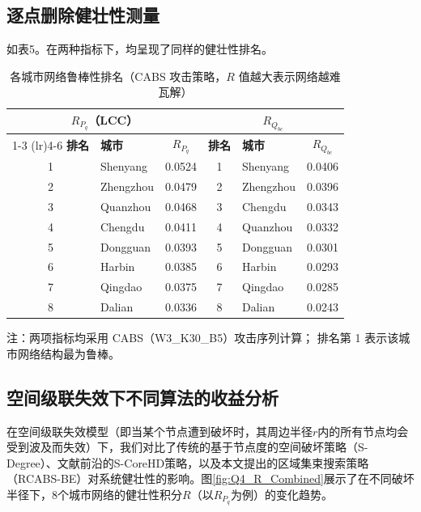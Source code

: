 \subsection{逐点删除健壮性测量}
如表5。在两种指标下，均呈现了同样的健壮性排名。
\begin{table}[htbp]
  \centering
  \caption{各城市网络鲁棒性排名（CABS 攻击策略，\(R\) 值越大表示网络越难瓦解）}
  \label{tab:robustness_ranking}
  \begin{tabular}{clcclc}
    \toprule
    \multicolumn{3}{c}{\(R_{P_q}\)（LCC）} & \multicolumn{3}{c}{\(R_{Q_{bc}}\)} \\
    \cmidrule(lr){1-3} \cmidrule(lr){4-6}
    \textbf{排名} & \textbf{城市} & \(R_{P_q}\) &
    \textbf{排名} & \textbf{城市} & \(R_{Q_{bc}}\) \\
    \midrule
    1 & Shenyang  & 0.0524 & 1 & Shenyang  & 0.0406 \\
    2 & Zhengzhou & 0.0479 & 2 & Zhengzhou & 0.0396 \\
    3 & Quanzhou  & 0.0468 & 3 & Chengdu   & 0.0343 \\
    4 & Chengdu   & 0.0411 & 4 & Quanzhou  & 0.0332 \\
    5 & Dongguan  & 0.0393 & 5 & Dongguan  & 0.0301 \\
    6 & Harbin    & 0.0385 & 6 & Harbin    & 0.0293 \\
    7 & Qingdao   & 0.0375 & 7 & Qingdao   & 0.0285 \\
    8 & Dalian    & 0.0336 & 8 & Dalian    & 0.0243 \\
    \bottomrule
  \end{tabular}
  \begin{minipage}{\linewidth}
    \vspace{2pt}
    \footnotesize 注：两项指标均采用 CABS（W3\_K30\_B5）攻击序列计算；
    排名第 1 表示该城市网络结构最为鲁棒。
  \end{minipage}
\end{table}

\subsection{空间级联失效下不同算法的收益分析}

在空间级联失效模型（即当某个节点遭到破坏时，其周边半径$r$内的所有节点均会受到波及而失效）下，我们对比了传统的基于节点度的空间破坏策略（S-Degree）、文献前沿的S-CoreHD策略，以及本文提出的区域集束搜索策略（RCABS-BE）对系统健壮性的影响。图\ref{fig:Q4_R_Combined}展示了在不同破坏半径下，8个城市网络的健壮性积分$R$（以$R_{P_q}$为例）的变化趋势。

